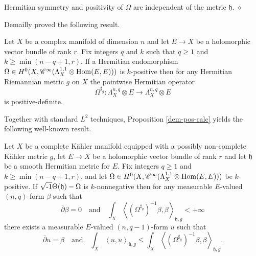 \documentclass[12pt,hidelinks]{amsart}
\newcommand{\sC}{{\mathscr C}}
\newcommand{\fh}{{\mathfrak h}}
\newcommand{\red}{\hfill $\diamond$}
\newcommand{\dbar}{\bar \partial}
\newcommand{\ii}{\sqrt{\text{\rm -}1}}
\newcommand{\tensor}{\otimes}
\begin{document}
\begin{s-rmk}
Hermitian symmetry and positivity of $\Omega$ are independent of the metric $\fh$.
\red
\end{s-rmk}

Demailly proved the following result.

\begin{prop}\label{dem-pos-calc}
Let $X$ be a complex manifold of dimension $n$ and let $E \to X$ be a holomorphic vector bundle of rank $r$.  Fix integers $q$ and $k$ such that $q \ge 1$ and $k\ge \min (n-q+1,r)$.  If a Hermitian endomorphism $\Omega \in H^0(X, \sC^{\infty} (\Lambda ^{1,1}_X \tensor {\rm Hom}(E,E)))$ is $k$-positive then for any Hermitian Riemannian metric $g$ on $X$ the pointwise Hermitian operator 
\[
\Omega ^{\sharp_g} : \Lambda ^{n,q} _X \tensor E \to \Lambda ^{n,q} _X \tensor E
\]
is positive-definite.
\end{prop}

Together with standard $L^2$ techniques, Proposition \ref{dem-pos-calc} yields the following well-known result.

\begin{thm}\label{skoda-est}
Let $X$ be a complete K\"ahler manifold equipped with a possibly non-complete K\"ahler metric $g$, let $E \to X$ be a holomorphic vector bundle of rank $r$ and let $\fh$ be a smooth Hermitian metric for $E$.  Fix integers $q \ge 1$ and $k \ge \min (n-q+1, r)$, and let $\Omega \in H^0(X, \sC^{\infty} (\Lambda ^{1,1} _X \tensor {\rm Hom} (E,E)))$ be $k$-positive.  If $\ii \Theta (\fh) -\Omega$ is $k$-nonnegative then for any measurable $E$-valued $(n,q)$-form $\beta$ such that 
\[
\dbar \beta = 0 \quad \text{and} \quad \int _X \left <( \Omega ^{\sharp _q})^{-1}\beta, \beta \right > _{\fh , g}< +\infty
\]
there exists a measurable $E$-valued $(n,q-1)$-form $u$ such that 
\[
\dbar u = \beta \quad \text{and} \quad \int _X \left <u,u\right >_{\fh ,g} \le \int _X \left <( \Omega ^{\sharp _q})^{-1}\beta, \beta \right >_{\fh, g}.
\]
\end{thm}
\end{document}
